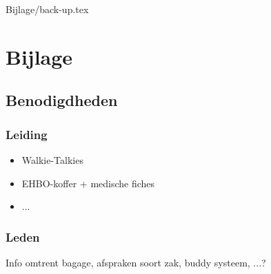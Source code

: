 \documentclass[fleqn,10pt]{src/KampSjabloon}
\begin{document}
{Bijlage/back-up.tex} %


\section{Bijlage}

\subsection{Benodigdheden
}

\subsubsection*{Leiding}

\begin{itemize}

\item Walkie-Talkies
\item EHBO-koffer + medische fiches
\item ...

\end{itemize}

\subsubsection*{Leden}
Info omtrent bagage, afspraken soort zak, buddy systeem, ...?
\end{document}
